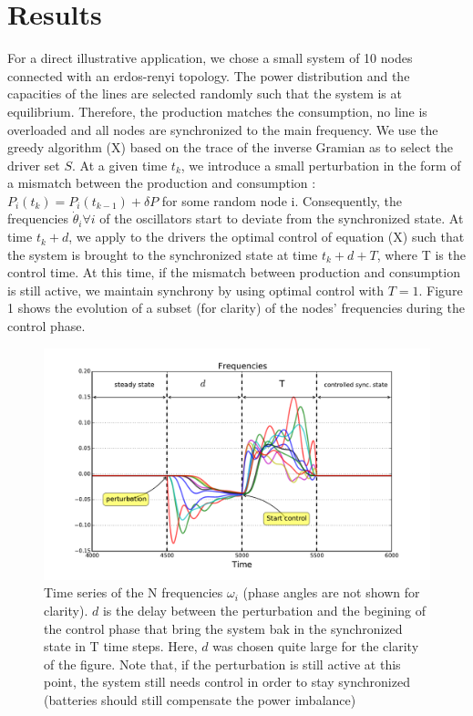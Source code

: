 \documentclass[conference]{IEEEtran}
\begin{document}
\section{Results}
\label{sec:Results}

For a direct illustrative application, we chose a small system of 10 nodes connected with an erdos-renyi topology. The power distribution and the capacities of the lines are selected randomly such that the system is at equilibrium. Therefore, the production matches the consumption, no line is overloaded and all nodes are synchronized to the main frequency. We use the greedy algorithm (X) based on the trace of the inverse Gramian as to select the driver set $S$. At a given time $ t_k $, we introduce a small perturbation in the form of a mismatch between the production and consumption : $P_i(t_k) = P_i(t_{k-1}) + \delta P$ for some random node i. Consequently, the frequencies $ \dot{ \theta }_i \forall i $ of the oscillators start to deviate from the synchronized state. At time $ t_k + d $, we apply to the drivers the optimal control of equation (X) such that the system is brought to the synchronized state at time $ t_k + d + T $, where T is the control time. At this time, if the mismatch between production and consumption is still active, we maintain synchrony by using optimal control with $T=1$. Figure 1 shows the evolution of a subset (for clarity) of the nodes' frequencies during the control phase.

\begin{figure}
\label{fig:frequecies}
\includegraphics[scale=.38]{./figure_2/figure_2}
\caption{Time series of the N frequencies $\omega_i$ (phase angles are not shown for clarity). $d$ is the delay between the perturbation and the begining of the control phase that bring the system bak in the synchronized state in T time steps. Here, $d$ was chosen quite large for the clarity of the figure. Note that, if the perturbation is still active at this point, the system still needs control in order to stay synchronized (batteries should still compensate the power imbalance)}
\end{figure}
\end{document}
